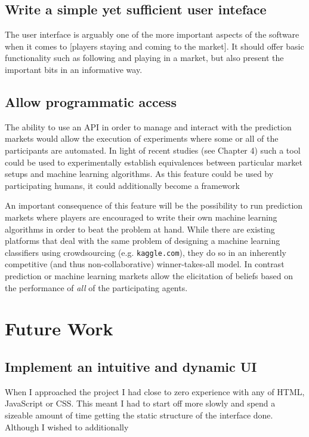 \documentclass[bsc,frontabs,twoside,singlespacing,parskip,deptreport]{infthesis}     %
\begin{document}
\subsection{Write a simple yet sufficient user inteface}
	The user interface is arguably one of the more important aspects of the software when it comes to [players staying and coming to the market]. It should offer basic functionality such as following and playing in a market, but also present the important bits in an informative way. 
	

\subsection{Allow programmatic access}
	The ability to use an API in order to manage and interact with the prediction markets would allow the execution of experiments where some or all of the participants are automated. In light of recent studies (see Chapter 4) such a tool could be used to experimentally establish equivalences between particular market setups and machine learning algorithms. As this feature could be used by participating humans, it could additionally become a framework 

	An important consequence of this feature will be the possibility to run prediction markets where players are encouraged to write their own machine learning algorithms in order to beat the problem at hand. While there are existing platforms that deal with the same problem of designing a machine learning classifiers using crowdsourcing (e.g. {\tt kaggle.com}), they do so in an inherently competitive (and thus non-collaborative) winner-takes-all model. In contrast prediction or machine learning markets allow the elicitation of beliefs based on the performance of {\em all} of the participating agents. 

\section{Future Work}

\subsection{Implement an intuitive and dynamic UI}
	When I approached the project I had close to zero experience with any of HTML, JavaScript or CSS. This meant I had to start off more slowly and spend a sizeable amount of time getting the static structure of the interface done. Although I wished to additionally 
\end{document}
